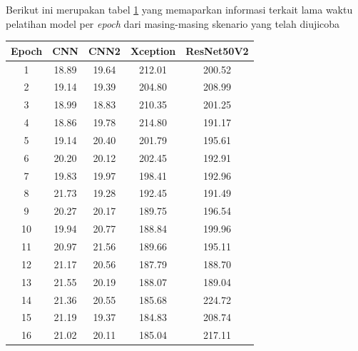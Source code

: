 Berikut ini merupakan tabel \ref*{tbl:training_time} yang memaparkan informasi terkait lama waktu pelatihan model per\textit{ epoch} dari masing-masing skenario yang telah diujicoba 
\begin{table}[!hbt]
	\centering
	\label{tbl:training_time}
	\begin{tabular}{|c|c|c|c|c|} 
	\hline
	Epoch & CNN & CNN2 & Xception & ResNet50V2\\
	\hline
	1              & 18.89        & 19.64         & 212.01            & 200.52              \\
	2              & 19.14        & 19.39         & 204.80            & 208.99              \\
	3              & 18.99        & 18.83         & 210.35            & 201.25              \\
	4              & 18.86        & 19.78         & 214.80            & 191.17              \\
	5              & 19.14        & 20.40         & 201.79            & 195.61              \\
	6              & 20.20        & 20.12         & 202.45            & 192.91              \\
	7              & 19.83        & 19.97         & 198.41            & 192.96              \\
	8              & 21.73        & 19.28         & 192.45            & 191.49              \\
	9              & 20.27        & 20.17         & 189.75            & 196.54              \\
	10             & 19.94        & 20.77         & 188.84            & 199.96              \\
	11             & 20.97        & 21.56         & 189.66            & 195.11              \\
	12             & 21.17        & 20.56         & 187.79            & 188.70              \\
	13             & 21.55        & 20.19         & 188.07            & 189.04              \\
	14             & 21.36        & 20.55         & 185.68            & 224.72              \\
	15             & 21.19        & 19.37         & 184.83            & 208.74              \\
	16             & 21.02        & 20.11         & 185.04            & 217.11              \\

\end{tabular}
\end{table}

